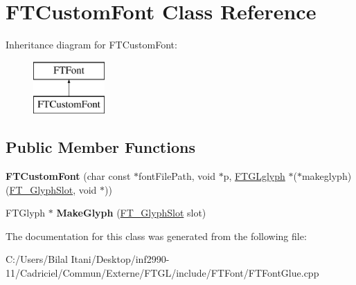 \hypertarget{class_f_t_custom_font}{}\section{F\+T\+Custom\+Font Class Reference}
\label{class_f_t_custom_font}
Inheritance diagram for F\+T\+Custom\+Font\+:\begin{figure}[H]
\begin{center}
\leavevmode
\includegraphics[height=2.000000cm]{class_f_t_custom_font}
\end{center}
\end{figure}
\subsection*{Public Member Functions}
\begin{DoxyCompactItemize}
\item 
{\bfseries F\+T\+Custom\+Font} (char const $\ast$font\+File\+Path, void $\ast$p, \hyperlink{struct___f_t_g_lglyph}{F\+T\+G\+Lglyph} $\ast$($\ast$makeglyph)(\hyperlink{struct_f_t___glyph_slot_rec__}{F\+T\+\_\+\+Glyph\+Slot}, void $\ast$))\hypertarget{class_f_t_custom_font_a752e3adba12661605536402b55381aa8}{}\label{class_f_t_custom_font_a752e3adba12661605536402b55381aa8}

\item 
F\+T\+Glyph $\ast$ {\bfseries Make\+Glyph} (\hyperlink{struct_f_t___glyph_slot_rec__}{F\+T\+\_\+\+Glyph\+Slot} slot)\hypertarget{class_f_t_custom_font_a14863f6c098d220681087ff85f004dff}{}\label{class_f_t_custom_font_a14863f6c098d220681087ff85f004dff}

\end{DoxyCompactItemize}


The documentation for this class was generated from the following file\+:\begin{DoxyCompactItemize}
\item 
C\+:/\+Users/\+Bilal Itani/\+Desktop/inf2990-\/11/\+Cadriciel/\+Commun/\+Externe/\+F\+T\+G\+L/include/\+F\+T\+Font/F\+T\+Font\+Glue.\+cpp\end{DoxyCompactItemize}
